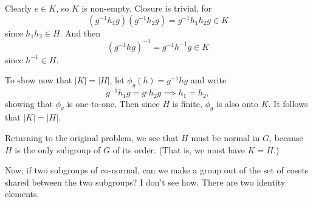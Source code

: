 \documentclass[12pt]{article}
\begin{document}
Clearly $e\in K$, so $K$ is non-empty.  Closure is trivial, for
\begin{equation*}
(g^{-1}h_1g)(g^{-1}h_2g)=g^{-1}h_1h_2g\in K
\end{equation*}
since $h_1h_2\in H$.  And then
\begin{equation*}
(g^{-1}hg)^{-1} = g^{-1}h^{-1}g\in K
\end{equation*}
since $h^{-1}\in H$.

To show now that $|K|=|H|$, let $\phi_g(h)=g^{-1}hg$ and
write
\begin{equation*}
g^{-1}h_1g = g^{_1}h_2g\implies h_1=h_2,
\end{equation*}
showing that $\phi_g$ is one-to-one.  Then since $H$ is finite,
$\phi_g$ is also onto $K$.  It follows that $|K|=|H|$.

Returning to the original problem, we see that $H$ must be normal in $G$,
because $H$ is the only subgroup of $G$ of its order.  (That is, we must have $K=H$.)

Now, if two subgroups of co-normal, can we make a group out of the
set of cosets shared between the two subgroups?  I don't see how.
There are two identity elements.
\end{document}
